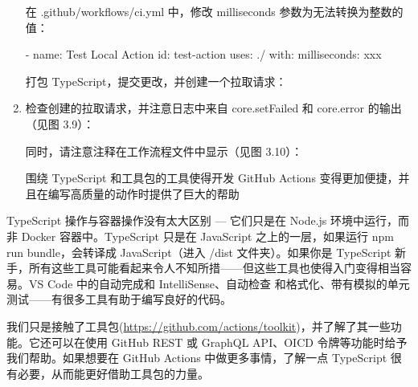 \begin{enumerate}
在 .github/workflows/ci.yml 中，修改 milliseconds 参数为无法转换为整数的值：

\begin{shell}
- name: Test Local Action
  id: test-action
  uses: ./
  with:
    milliseconds: xxx
\end{shell}

打包 TypeScript，提交更改，并创建一个拉取请求：

  
\item 
检查创建的拉取请求，并注意日志中来自 core.setFailed 和 core.error 的输出（见图 3.9）：


同时，请注意注释在工作流程文件中显示（见图 3.10）：


围绕 TypeScript 和工具包的工具使得开发 GitHub Actions 变得更加便捷，并且在编写高质量的动作时提供了巨大的帮助
\end{enumerate}


TypeScript 操作与容器操作没有太大区别 --- 它们只是在 Node.js 环境中运行，而非 Docker 容器中。TypeScript 只是在 JavaScript 之上的一层，如果运行 npm run bundle，会转译成 JavaScript（进入 /dist 文件夹）。如果你是 TypeScript 新手，所有这些工具可能看起来令人不知所措——但这些工具也使得入门变得相当容易。VS Code 中的自动完成和 IntelliSense、自动检查 和格式化、带有模拟的单元测试——有很多工具有助于编写良好的代码。


我们只是接触了工具包(\url{https://github.com/actions/toolkit})，并了解了其一些功能。它还可以在使用 GitHub REST 或 GraphQL API、OICD 令牌等功能时给予我们帮助。如果想要在 GitHub Actions 中做更多事情，了解一点 TypeScript 很有必要，从而能更好借助工具包的力量。
